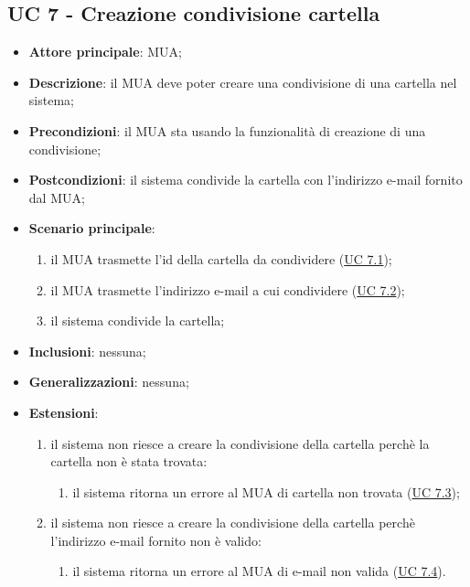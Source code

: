 \subsection{UC 7 - Creazione condivisione cartella} \label{sec:UC7}

    \begin{itemize}
        \item \textbf{Attore principale}: MUA;
        \item \textbf{Descrizione}: il MUA deve poter creare una condivisione di una cartella nel sistema;
        \item \textbf{Precondizioni}: il MUA sta usando la funzionalità di creazione di una condivisione;
        \item \textbf{Postcondizioni}: il sistema condivide la cartella con l'indirizzo e-mail fornito dal MUA;
        \item \textbf{Scenario principale}:
            \begin{enumerate}
                \item il MUA trasmette l'id della cartella da condividere (\hyperref[sec:UC7.1]{UC 7.1});
                \item il MUA trasmette l'indirizzo e-mail a cui condividere (\hyperref[sec:UC7.2]{UC 7.2});
                \item il sistema condivide la cartella;
            \end{enumerate}
        \item \textbf{Inclusioni}: nessuna;
        \item \textbf{Generalizzazioni}: nessuna;
        \item \textbf{Estensioni}: 
        \begin{enumerate}[label=\alph*.]
            \item il sistema non riesce a creare la condivisione della cartella perchè la cartella non è stata trovata:
            \begin{enumerate}[label=\arabic*.]
                \item il sistema ritorna un errore al MUA di cartella non trovata (\hyperref[sec:UC7.3]{UC 7.3});
            \end{enumerate}
            \item il sistema non riesce a creare la condivisione della cartella perchè l'indirizzo e-mail fornito non è valido:
            \begin{enumerate}[label=\arabic*.]
                \item il sistema ritorna un errore al MUA di e-mail non valida (\hyperref[sec:UC7.4]{UC 7.4}).
            \end{enumerate}
        \end{enumerate}
    \end{itemize}

